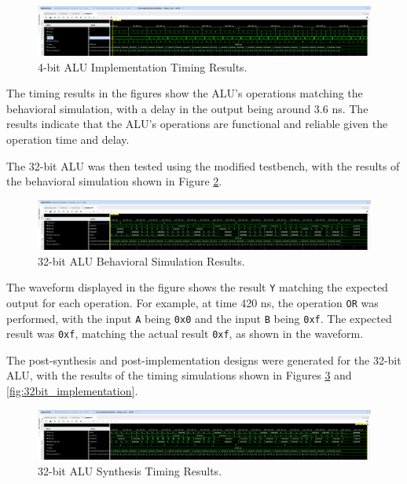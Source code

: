 \documentclass[CMPE]{KGCOEReport}
\begin{document}
\begin{figure}[H]
    \centering
    \includegraphics[width=1\textwidth]{implement.png}
    \caption{4-bit ALU Implementation Timing Results.}
    \label{fig:4bit_implementation}
\end{figure}

The timing results in the figures show the ALU's operations matching the behavioral simulation, with a delay in the output being around 3.6 ns. The results indicate that the ALU's operations are functional and reliable given the operation time and delay.

The 32-bit ALU was then tested using the modified testbench, with the results of the behavioral simulation shown in Figure \ref{fig:32bit_behavior}.

\begin{figure}[H]
    \centering
    \includegraphics[width=1\textwidth]{behavior2.png}
    \caption{32-bit ALU Behavioral Simulation Results.}
    \label{fig:32bit_behavior}
\end{figure}

The waveform displayed in the figure shows the result \verb|Y| matching the expected output for each operation. For example, at time 420 ns, the operation \verb|OR| was performed, with the input \verb|A| being \verb|0x0| and the input \verb|B| being \verb|0xf|. The expected result was \verb|0xf|, matching the actual result \verb|0xf|, as shown in the waveform.

The post-synthesis and post-implementation designs were generated for the 32-bit ALU, with the results of the timing simulations shown in Figures \ref{fig:32bit_synthesis} and \ref{fig:32bit_implementation}.

\begin{figure}[H]
    \centering
    \includegraphics[width=1\textwidth]{synth2.png}
    \caption{32-bit ALU Synthesis Timing Results.}
    \label{fig:32bit_synthesis}
\end{figure}
\end{document}
